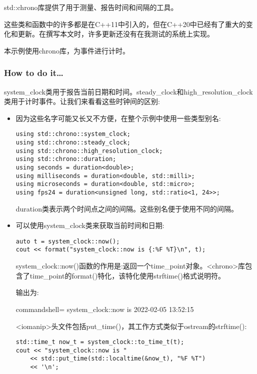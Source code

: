 
std::chrono库提供了用于测量、报告时间和间隔的工具。

这些类和函数中的许多都是在C++11中引入的，但在C++20中已经有了重大的变化和更新。在撰写本文时，许多更新还没有在我测试的系统上实现。

本示例使用chrono库，为事件进行计时。

\subsubsection{How to do it…}

system\_clock类用于报告当前日期和时间。steady\_clock和high\_resolution\_clock类用于计时事件。让我们来看看这些时钟间的区别:

\begin{itemize}
\item 
因为这些名字可能又长又不方便，在整个示例中使用一些类型别名:

\begin{lstlisting}[style=styleCXX]
using std::chrono::system_clock;
using std::chrono::steady_clock;
using std::chrono::high_resolution_clock;
using std::chrono::duration;
using seconds = duration<double>;
using milliseconds = duration<double, std::milli>;
using microseconds = duration<double, std::micro>;
using fps24 = duration<unsigned long, std::ratio<1, 24>>;
\end{lstlisting}

duration类表示两个时间点之间的间隔。这些别名便于使用不同的间隔。

\item 
可以使用system\_clock类来获取当前时间和日期:

\begin{lstlisting}[style=styleCXX]
auto t = system_clock::now();
cout << format("system_clock::now is {:%F %T}\n", t);
\end{lstlisting}

system\_clock::now()函数的作用是:返回一个time\_point对象。<chrono>库包含了time\_point的format()特化，该特化使用strftime()格式说明符。

输出为:

\begin{tcblisting}{commandshell={}}
system_clock::now is 2022-02-05 13:52:15
\end{tcblisting}

<iomanip>头文件包括put\_time()，其工作方式类似于ostream的strftime():

\begin{lstlisting}[style=styleCXX]
std::time_t now_t = system_clock::to_time_t(t);
cout << "system_clock::now is "
	<< std::put_time(std::localtime(&now_t), "%F %T")
	<< '\n';
\end{lstlisting}


\end{itemize}
